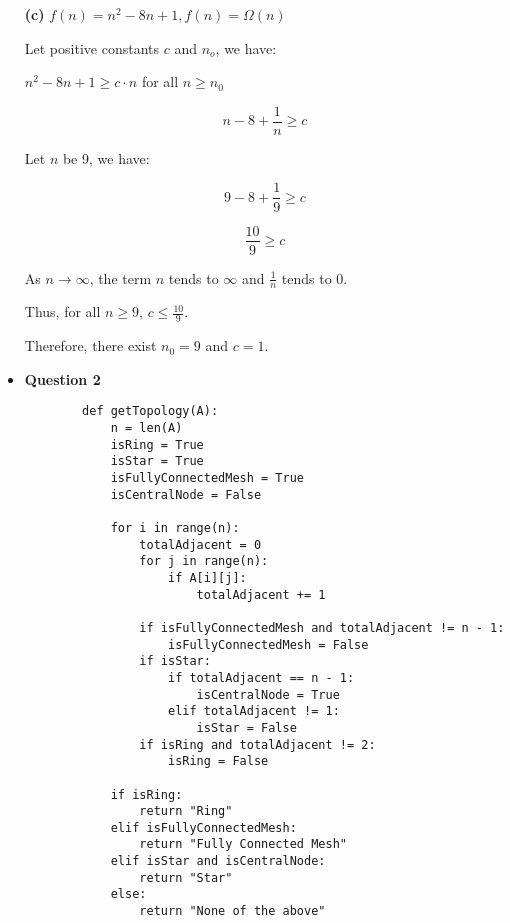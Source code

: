 \documentclass{article}
\begin{document}
\begin{itemize}
    \textbf{(c)} $f(n) = n^2 - 8n + 1, f(n) = \Omega(n)$

    Let positive constants $c$ and $n_o$, we have:

    \begin{center}
        $n^2 - 8n + 1 \ge c\cdot n$ for all $n \ge n_0$
    \end{center}

    $$n - 8 + \frac{1}{n} \ge c$$

    Let $n$ be 9, we have:

    $$9 - 8 + \frac{1}{9} \ge c$$

    $$\frac{10}{9} \ge c$$

    As $n \to \infty$, the term $n$ tends to $\infty$ and $\frac{1}{n}$ tends to $0$.

    Thus, for all $n \ge 9$, $c \le \frac{10}{9}$.

    Therefore, there exist $n_0 = 9$ and $c = 1$.\\


    \item\textbf{ Question 2}
    \begin{lstlisting}
        def getTopology(A):
            n = len(A)
            isRing = True
            isStar = True
            isFullyConnectedMesh = True
            isCentralNode = False

            for i in range(n):
                totalAdjacent = 0
                for j in range(n):
                    if A[i][j]:
                        totalAdjacent += 1

                if isFullyConnectedMesh and totalAdjacent != n - 1:
                    isFullyConnectedMesh = False
                if isStar:
                    if totalAdjacent == n - 1:
                        isCentralNode = True
                    elif totalAdjacent != 1:
                        isStar = False
                if isRing and totalAdjacent != 2:
                    isRing = False

            if isRing:
                return "Ring"
            elif isFullyConnectedMesh:
                return "Fully Connected Mesh"
            elif isStar and isCentralNode:
                return "Star"
            else:
                return "None of the above"
    \end{lstlisting}
\end{itemize}
\end{document}
